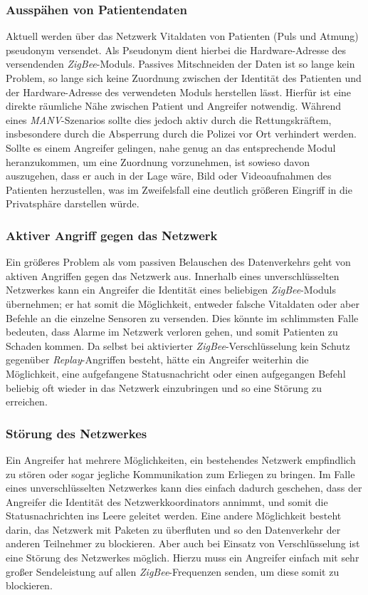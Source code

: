 \subsubsection{Ausspähen von Patientendaten}
Aktuell werden über das Netzwerk Vitaldaten von Patienten (Puls und Atmung) pseudonym versendet. Als Pseudonym dient 
hierbei die Hardware-Adresse des versendenden \emph{ZigBee}-Moduls. Passives Mitschneiden der Daten ist so lange kein Problem,
so lange sich keine Zuordnung zwischen der Identität des Patienten und der Hardware-Adresse des verwendeten Moduls
herstellen lässt. Hierfür ist eine direkte räumliche Nähe zwischen Patient und Angreifer notwendig. 
Während eines \emph{MANV}-Szenarios sollte dies jedoch aktiv durch die Rettungskräftem, insbesondere durch die Absperrung 
durch die Polizei vor Ort verhindert werden. Sollte es einem Angreifer gelingen, nahe genug an das entsprechende Modul
heranzukommen, um eine Zuordnung vorzunehmen, ist sowieso davon auszugehen, dass er auch in der Lage wäre, Bild oder
Videoaufnahmen des Patienten herzustellen, was im Zweifelsfall eine deutlich größeren Eingriff in die Privatsphäre 
darstellen würde.

\subsubsection{Aktiver Angriff gegen das Netzwerk}
Ein größeres Problem als vom passiven Belauschen des Datenverkehrs geht von aktiven Angriffen gegen das Netzwerk
aus. Innerhalb eines unverschlüsselten Netzwerkes kann ein Angreifer die Identität eines beliebigen \emph{ZigBee}-Moduls 
übernehmen; er hat somit die Möglichkeit, entweder falsche Vitaldaten oder aber Befehle an die einzelne Sensoren zu
versenden. Dies könnte im schlimmsten Falle bedeuten, dass Alarme im Netzwerk verloren gehen, und somit Patienten
zu Schaden kommen. Da selbst bei aktivierter \emph{ZigBee}-Verschlüsselung kein Schutz gegenüber 
\emph{Replay}-Angriffen besteht, hätte
ein Angreifer weiterhin die Möglichkeit, eine aufgefangene Statusnachricht oder einen aufgegangen Befehl beliebig oft
wieder in das Netzwerk einzubringen und so eine Störung zu erreichen.

\subsubsection{Störung des Netzwerkes}
Ein Angreifer hat mehrere Möglichkeiten, ein bestehendes Netzwerk empfindlich zu stören oder sogar jegliche Kommunikation
zum Erliegen zu bringen. Im Falle eines unverschlüsselten Netzwerkes kann dies einfach dadurch geschehen, dass 
der Angreifer die Identität des Netzwerkkoordinators annimmt, und somit die Statusnachrichten ins Leere geleitet werden. Eine
andere Möglichkeit besteht darin, das Netzwerk mit Paketen zu überfluten und so den Datenverkehr der anderen Teilnehmer
zu blockieren. Aber auch bei Einsatz von Verschlüsselung ist eine Störung des Netzwerkes möglich. Hierzu muss ein Angreifer
einfach mit sehr großer Sendeleistung auf allen \emph{ZigBee}-Frequenzen senden, um diese somit zu blockieren. 

